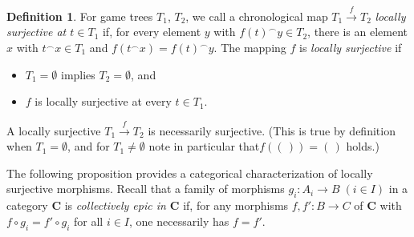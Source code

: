 \documentclass[12pt]{amsart}
\theoremstyle{definition}
\newtheorem{defn}[thm]{Definition}
\newcommand{\seq}[1]{{\left( {#1} \right)}}
\begin{document}
\begin{defn}
	For game trees $T_1$, $T_2$, we call a chronological map  $T_1\stackrel{f}{\to} T_2$ {\em locally surjective at $t\in T_1$} if, for every element $y$ with $f(t)^\smallfrown y\in T_2$, there is an element $x$ with  $t^\smallfrown x\in T_1$ and $f(t^\smallfrown x)=f(t)^\smallfrown y$. 
	The mapping $f$ is {\em locally surjective} if
	\begin{itemize}
		\item $T_1= \emptyset$ implies $T_2= \emptyset$, and
		\item $f$ is locally surjective at every $t\in T_1$.
	\end{itemize}
\end{defn}


A locally surjective $T_1\stackrel{f}{\to} T_2$ is necessarily surjective. (This is true by definition when $T_1= \emptyset$, and for $T_1\neq\emptyset$ note in particular that$f(\seq{\,})=\seq{\,}$ holds.)

The following proposition provides a categorical characterization of locally surjective morphisms. Recall that a family of morphisms $g_i:A_i\to B\;(i\in I)$ in a category $\mathbf{C}$ is \emph{collectively epic in $\mathbf{C}$} if, for any morphisms $f,f'\colon B\to C$ of $\mathbf{C}$ with $f\circ g_i= f'\circ g_i$ for all $i\in I$, one necessarily has $f=f'$.
\end{document}
